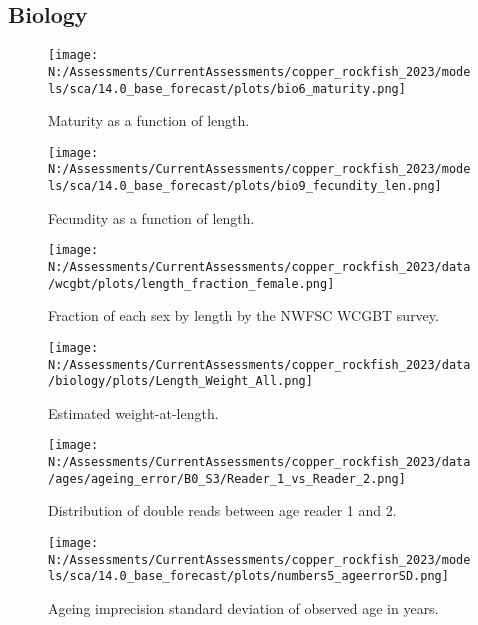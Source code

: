 \documentclass[11pt,
  english,
  letterpaper,
]{article}
\begin{document}
\hypertarget{biology}{%
\subsection{Biology}\label{biology}}

\begin{figure}
\centering
\texttt{[image: N:/Assessments/CurrentAssessments/copper\_rockfish\_2023/models/sca/14.0\_base\_forecast/plots/bio6\_maturity.png]}
\caption{Maturity as a function of length.\label{fig:maturity}}
\end{figure}

\pagebreak

\begin{figure}
\centering
\texttt{[image: N:/Assessments/CurrentAssessments/copper\_rockfish\_2023/models/sca/14.0\_base\_forecast/plots/bio9\_fecundity\_len.png]}
\caption{Fecundity as a function of length.\label{fig:fecundity}}
\end{figure}

\pagebreak

\begin{figure}
\centering
\texttt{[image: N:/Assessments/CurrentAssessments/copper\_rockfish\_2023/data/wcgbt/plots/length\_fraction\_female.png]}
\caption{Fraction of each sex by length by the NWFSC WCGBT survey.\label{fig:frac-sex-len}}
\end{figure}

\pagebreak

\begin{figure}
\centering
\texttt{[image: N:/Assessments/CurrentAssessments/copper\_rockfish\_2023/data/biology/plots/Length\_Weight\_All.png]}
\caption{Estimated weight-at-length.\label{fig:weight-length}}
\end{figure}

\pagebreak

\begin{figure}
\centering
\texttt{[image: N:/Assessments/CurrentAssessments/copper\_rockfish\_2023/data/ages/ageing\_error/B0\_S3/Reader\_1\_vs\_Reader\_2.png]}
\caption{Distribution of double reads between age reader 1 and 2.\label{fig:age-error-dist}}
\end{figure}

\pagebreak

\begin{figure}
\centering
\texttt{[image: N:/Assessments/CurrentAssessments/copper\_rockfish\_2023/models/sca/14.0\_base\_forecast/plots/numbers5\_ageerrorSD.png]}
\caption{Ageing imprecision standard deviation of observed age in years.\label{fig:age-error}}
\end{figure}
\end{document}
